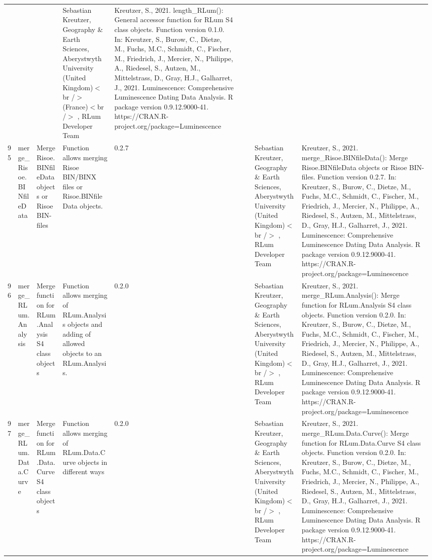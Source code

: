 \begin{table}[ht]
\begin{tabular}{rllllllll}
 &  &  & Sebastian Kreutzer, Geography \& Earth Sciences, Aberystwyth University (United Kingdom)$<$br /$>$ (France)$<$br /$>$ , RLum Developer Team & Kreutzer, S., 2021. length\_RLum(): General accessor function for RLum S4 class objects. Function version 0.1.0. In: Kreutzer, S., Burow, C., Dietze, M., Fuchs, M.C., Schmidt, C., Fischer, M., Friedrich, J., Mercier, N., Philippe, A., Riedesel, S., Autzen, M., Mittelstrass, D., Gray, H.J., Galharret, J., 2021. Luminescence: Comprehensive Luminescence Dating Data Analysis. R package version 0.9.12.9000-41. https://CRAN.R-project.org/package=Luminescence
 \\ 
  95 & merge\_Risoe.BINfileData & Merge Risoe.BINfileData objects or Risoe BIN-files & Function allows merging Risoe BIN/BINX files or  Risoe.BINfileData  objects. & 0.2.7
 &  &  & Sebastian Kreutzer, Geography \& Earth Sciences, Aberystwyth University (United Kingdom)$<$br /$>$ , RLum Developer Team & Kreutzer, S., 2021. merge\_Risoe.BINfileData(): Merge Risoe.BINfileData objects or Risoe BIN-files. Function version 0.2.7. In: Kreutzer, S., Burow, C., Dietze, M., Fuchs, M.C., Schmidt, C., Fischer, M., Friedrich, J., Mercier, N., Philippe, A., Riedesel, S., Autzen, M., Mittelstrass, D., Gray, H.J., Galharret, J., 2021. Luminescence: Comprehensive Luminescence Dating Data Analysis. R package version 0.9.12.9000-41. https://CRAN.R-project.org/package=Luminescence
 \\ 
  96 & merge\_RLum.Analysis & Merge function for RLum.Analysis S4 class objects & Function allows merging of RLum.Analysis objects and adding of allowed objects to an RLum.Analysis. & 0.2.0
 &  &  & Sebastian Kreutzer, Geography \& Earth Sciences, Aberystwyth University (United Kingdom)$<$br /$>$ , RLum Developer Team & Kreutzer, S., 2021. merge\_RLum.Analysis(): Merge function for RLum.Analysis S4 class objects. Function version 0.2.0. In: Kreutzer, S., Burow, C., Dietze, M., Fuchs, M.C., Schmidt, C., Fischer, M., Friedrich, J., Mercier, N., Philippe, A., Riedesel, S., Autzen, M., Mittelstrass, D., Gray, H.J., Galharret, J., 2021. Luminescence: Comprehensive Luminescence Dating Data Analysis. R package version 0.9.12.9000-41. https://CRAN.R-project.org/package=Luminescence
 \\ 
  97 & merge\_RLum.Data.Curve & Merge function for RLum.Data.Curve S4 class objects & Function allows merging of RLum.Data.Curve objects in different ways & 0.2.0
 &  &  & Sebastian Kreutzer, Geography \& Earth Sciences, Aberystwyth University (United Kingdom)$<$br /$>$ , RLum Developer Team & Kreutzer, S., 2021. merge\_RLum.Data.Curve(): Merge function for RLum.Data.Curve S4 class objects. Function version 0.2.0. In: Kreutzer, S., Burow, C., Dietze, M., Fuchs, M.C., Schmidt, C., Fischer, M., Friedrich, J., Mercier, N., Philippe, A., Riedesel, S., Autzen, M., Mittelstrass, D., Gray, H.J., Galharret, J., 2021. Luminescence: Comprehensive Luminescence Dating Data Analysis. R package version 0.9.12.9000-41. https://CRAN.R-project.org/package=Luminescence

\end{tabular}
\end{table}
